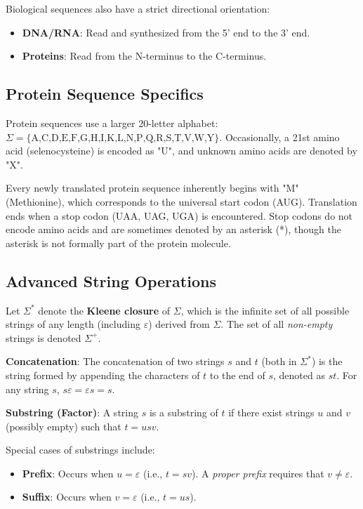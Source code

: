 Biological sequences also have a strict directional orientation:
\begin{itemize}
    \item \textbf{DNA/RNA}: Read and synthesized from the 5' end to the 3' end.
    \item \textbf{Proteins}: Read from the N-terminus to the C-terminus.
\end{itemize}

\subsection{Protein Sequence Specifics}
Protein sequences use a larger 20-letter alphabet: $\Sigma = \{\text{A,C,D,E,F,G,H,I,K,L,N,P,Q,R,S,T,V,W,Y}\}$. 
Occasionally, a 21st amino acid (selenocysteine) is encoded as "U", and unknown amino acids are denoted by "X". 

\sta Every newly translated protein sequence inherently begins with "M" (Methionine), which corresponds to the universal start codon (AUG). Translation ends when a stop codon (UAA, UAG, UGA) is encountered. Stop codons do not encode amino acids and are sometimes denoted by an asterisk (*), though the asterisk is not formally part of the protein molecule.

\subsection{Advanced String Operations}
Let $\Sigma^*$ denote the \textbf{Kleene closure} of $\Sigma$, which is the infinite set of all possible strings of any length (including $\varepsilon$) derived from $\Sigma$. The set of all \emph{non-empty} strings is denoted $\Sigma^+$.

\begin{important}
    \textbf{Concatenation}: The concatenation of two strings $s$ and $t$ (both in $\Sigma^*$) is the string formed by appending the characters of $t$ to the end of $s$, denoted as $st$. For any string $s$, $s\varepsilon = \varepsilon s = s$.
\end{important}

\begin{important}
    \textbf{Substring (Factor)}: A string $s$ is a substring of $t$ if there exist strings $u$ and $v$ (possibly empty) such that $t = usv$.
\end{important}

Special cases of substrings include:
\begin{itemize}
    \item \textbf{Prefix}: Occurs when $u = \varepsilon$ (i.e., $t = sv$). A \textit{proper prefix} requires that $v \neq \varepsilon$.
    \item \textbf{Suffix}: Occurs when $v = \varepsilon$ (i.e., $t = us$).
\end{itemize}

